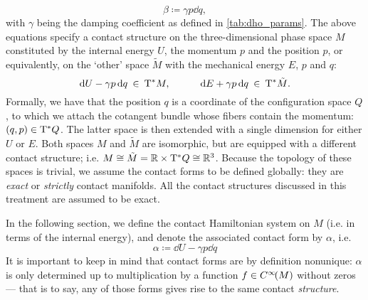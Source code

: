\begin{equation}
    \beta \coloneq \gamma p \dd{q},
    \label{eq:dho_work_form}
\end{equation}
with $\gamma$ being the damping coefficient as defined in \cref{tab:dho_params}. The above equations specify a contact structure on the three-dimensional phase space $M$ constituted by the internal energy $U$, the momentum $p$ and the position $p$, or equivalently, on the `other' space $\tilde{M}$ with the mechanical energy $E$, $p$ and $q$:
$$ \dd{U} - \gamma p \dd{q} \: \in \: \mathrm{T}^*M, \qquad \quad \dd{E} + \gamma p \dd{q} \: \in \: \mathrm{T}^*\tilde{M}. $$
Formally, we have that the position $q$ is a coordinate of the configuration space $Q$, to which we attach the cotangent bundle whose fibers contain the momentum: $ (q, p) \in \mathrm{T}^*Q$. The latter space is then extended with a single dimension for either $U$ or $E$. Both spaces $M$ and $\tilde{M}$ are isomorphic, but are equipped with a different contact structure; i.e. $M \cong \tilde{M} = \mathbb{R} \times \mathrm{T}^*Q \cong \mathbb{R}^3$. Because the topology of these spaces is trivial, we assume the contact forms to be defined globally: they are \emph{exact} or \emph{strictly} contact manifolds. All the contact structures discussed in this treatment are assumed to be exact.

In the following section, we define the contact Hamiltonian system on $M$ (i.e. in terms of the internal energy), and denote the associated contact form by $\alpha$, i.e.
\begin{equation}
    \alpha \coloneq \dd{U} - \gamma p \dd{q}
    \label{eq:dho_contact_form_thermo}
\end{equation}
It is important to keep in mind that contact forms are by definition nonunique: $\alpha$ is only determined up to multiplication by a function $f \in C^\infty\!\qty(M)$ without zeros --- that is to say, any of those forms gives rise to the same contact \emph{structure}.

